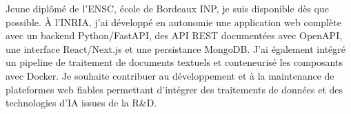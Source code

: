
\begin{cvparagraph}
Jeune diplômé de l’ENSC, école de Bordeaux INP, je suis disponible dès que possible. À l’INRIA, j’ai développé en autonomie une application web complète avec un backend Python/FastAPI, des API REST documentées avec OpenAPI, une interface React/Next.js et une persistance MongoDB. J’ai également intégré un pipeline de traitement de documents textuels et conteneurisé les composants avec Docker. Je souhaite contribuer au développement et à la maintenance de plateformes web fiables permettant d’intégrer des traitements de données et des technologies d’IA issues de la R\&D.
\end{cvparagraph}

